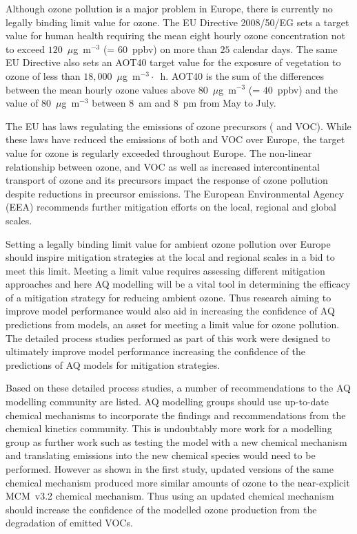 Although ozone pollution is a major problem in Europe, there is currently no legally binding limit value for ozone.
The EU Directive 2008/50/EG sets a target value for human health requiring the mean eight hourly ozone concentration not to exceed $120$~$\mu$g~m$^{-3}$ (= $60$~ppbv) on more than $25$ calendar days.
The same EU Directive also sets an AOT40 target value for the exposure of vegetation to ozone of less than $18,000$~$\mu$g~m$^{-3} \cdot$~h. 
AOT40 is the sum of the differences between the mean hourly ozone values above $80$~$\mu$g~m$^{-3}$ (= $40$~ppbv) and the value of $80$~$\mu$g~m$^{-3}$ between 8~am and 8~pm from May to July.

The EU has laws regulating the emissions of ozone precursors ( and VOC).
While these laws have reduced the emissions of both  and VOC over Europe, the target value for ozone is regularly exceeded throughout Europe.
The non-linear relationship between ozone,  and VOC as well as increased intercontinental transport of ozone and its precursors impact the response of ozone pollution despite reductions in precursor emissions.
The European Environmental Agency (EEA) recommends further mitigation efforts on the local, regional and global scales.

Setting a legally binding limit value for ambient ozone pollution over Europe should inspire mitigation strategies at the local and regional scales in a bid to meet this limit.
Meeting a limit value requires assessing different mitigation approaches and here AQ modelling will be a vital tool in determining the efficacy of a mitigation strategy for reducing ambient ozone. 
Thus research aiming to improve model performance would also aid in increasing the confidence of AQ predictions from models, an asset for meeting a limit value for ozone pollution.
The detailed process studies performed as part of this work were designed to ultimately improve model performance increasing the confidence of the predictions of AQ models for mitigation strategies.

Based on these detailed process studies, a number of recommendations to the AQ modelling community are listed.
AQ modelling groups should use up-to-date chemical mechanisms to incorporate the findings and recommendations from the chemical kinetics community.
This is undoubtably more work for a modelling group as further work such as testing the model with a new chemical mechanism and translating emissions into the new chemical species would need to be performed.
However as shown in the first study, updated versions of the same chemical mechanism produced more similar amounts of ozone to the near-explicit MCM~v3.2 chemical mechanism.
Thus using an updated chemical mechanism should increase the confidence of the modelled ozone production from the degradation of emitted VOCs.

